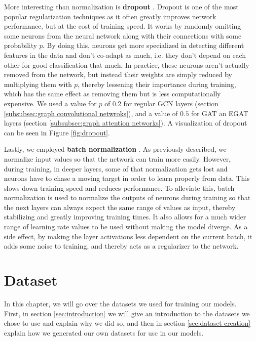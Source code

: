 \documentclass[times, utf8, diplomski, english]{fer_eng}
\begin{document}
More interesting than normalization is \textbf{dropout} \cite{dropout} \cite{dropout2}. Dropout is one of the most popular regularization techniques as it often greatly improves network performance, but at the cost of training speed. It works by randomly omitting some neurons from the neural network along with their connections with some probability $p$. By doing this, neurons get more specialized in detecting different features in the data and don't co-adapt as much, i.e. they don't depend on each other for good classification that much. In practice, these neurons aren't actually removed from the network, but instead their weights are simply reduced by multiplying them with $p$, thereby lessening their importance during training, which has the same effect as removing them but is less computationally expensive. We used a value for $p$ of 0.2 for regular GCN layers (section \ref{subsubsec:graph convolutional netwroks}), and a value of $0.5$ for GAT an EGAT layers (section \ref{subsubsec:graph attention networks}). A visualization of dropout can be seen in Figure \ref{fig:dropout}.

Lastly, we employed \textbf{batch normalization} \cite{bn}. As previously described, we normalize input values so that the network can train more easily. However, during training, in deeper layers, some of that normalization gets lost and neurons have to chase a moving target in order to learn properly from data. This slows down training speed and reduces performance. To alleviate this, batch normalization is used to normalize the outputs of neurons during training so that the next layers can always expect the same range of values as input, thereby stabilizing and greatly improving training times. It also allows for a much wider range of learning rate values to be used without making the model diverge. As a side effect, by making the layer activations less dependent on the current batch, it adds some noise to training, and thereby acts as a regularizer to the network.

\chapter{Dataset}
\label{ch:dataset}

In this chapter, we will go over the datasets we used for training our models. First, in section \ref{sec:introduction} we will give an introduction to the datasets we chose to use and explain why we did so, and then in section \ref{sec:dataset creation} explain how we generated our own datasets for use in our models.
\end{document}
